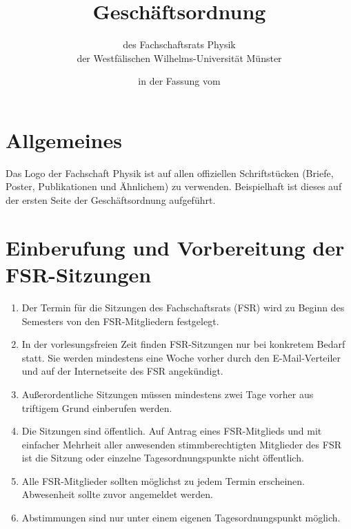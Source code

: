 


\pagestyle{scrheadings}

\title{Geschäftsordnung}
\subtitle{des Fachschaftsrats Physik\\
der Westfälischen Wilhelms-Universität Münster}
\date{in der Fassung vom }
\author{}



\maketitle

\section{Allgemeines}
Das Logo der Fachschaft Physik ist auf allen offiziellen Schriftstücken (Briefe, Poster, Publikationen und Ähnlichem) zu verwenden.
Beispielhaft ist dieses auf der ersten Seite der Geschäftsordnung aufgeführt.

\section{Einberufung und Vorbereitung der FSR-Sitzungen}
\begin{enumerate}
	\item Der Termin für die Sitzungen des Fachschaftsrats (FSR) wird zu Beginn des Semesters von den FSR-Mitgliedern festgelegt.
	\item In der vorlesungsfreien Zeit finden FSR-Sitzungen nur bei konkretem Bedarf statt.
	Sie werden mindestens eine Woche vorher durch den E-Mail-Verteiler und auf der Internetseite des FSR angekündigt.
	\item Außerordentliche Sitzungen müssen mindestens zwei Tage vorher aus triftigem Grund einberufen werden.
	\item Die Sitzungen sind öffentlich.
	Auf Antrag eines FSR-Mitglieds und mit einfacher Mehrheit aller anwesenden stimmberechtigten Mitglieder des FSR ist die Sitzung oder einzelne Tagesordnungspunkte nicht öffentlich.
	\item Alle FSR-Mitglieder sollten möglichst zu jedem Termin erscheinen.
	Abwesenheit sollte zuvor angemeldet werden.
	\item Abstimmungen sind nur unter einem eigenen Tagesordnungspunkt möglich.
\end{enumerate}

